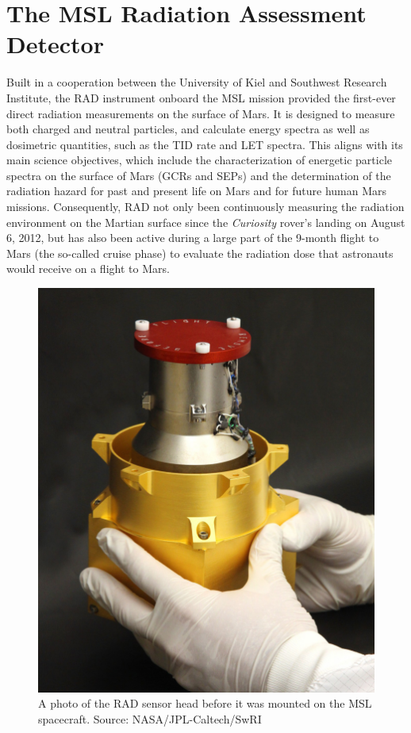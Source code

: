 \section{The MSL Radiation Assessment Detector}
\label{sec:mslrad}

Built in a cooperation between the University of Kiel and Southwest Research Institute, the \acl{RAD} \citep[\acs{RAD},][]{Hassler-2012-MSLRAD} instrument onboard the \acl{MSL} \citep[\acs{MSL},][]{Grotzinger-2012} mission provided the first-ever direct radiation measurements on the surface of Mars. It is designed to measure both charged and neutral particles, and calculate energy spectra as well as dosimetric quantities, such as the \ac{TID} rate and \ac{LET} spectra. This aligns with its main science objectives, which include the characterization of energetic particle spectra on the surface of Mars (\acp{GCR} and \acp{SEP}) and the determination of the radiation hazard for past and present life on Mars and for future human Mars missions. Consequently, \ac{RAD} not only been continuously measuring the radiation environment on the Martian surface since the \textit{Curiosity} rover's landing on August 6, 2012, but has also been active during a large part of the 9-month flight to Mars (the so-called cruise phase) to evaluate the radiation dose that astronauts would receive on a flight to Mars.

\begin{figure}
	\centering
	\includegraphics[width=0.4\linewidth]{images/rad}
	\caption[Photo of the \acs{RAD} sensor head]{A photo of the \ac{RAD} sensor head before it was mounted on the \ac{MSL} spacecraft. Source: NASA/JPL-Caltech/SwRI}
	\label{fig:rad-photo}
\end{figure}

